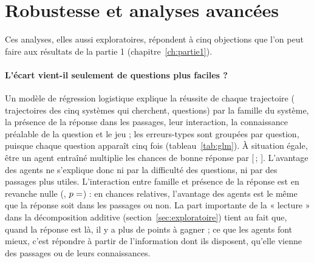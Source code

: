 
\section{Robustesse et analyses avancées}\label{sec:avance}

Ces analyses, elles aussi exploratoires, répondent à cinq objections que l'on peut faire aux résultats de la partie 1 (chapitre~\ref{ch:partie1}).

\paragraph{L'écart vient-il seulement de questions plus faciles ?} Un modèle de régression logistique explique la réussite de chaque trajectoire ( trajectoires des cinq systèmes qui cherchent,  questions) par la famille du système, la présence de la réponse dans les passages, leur interaction, la connaissance préalable de la question et le jeu ; les erreurs-types sont groupées par question, puisque chaque question apparaît cinq fois (tableau~\ref{tab:glm}). À situation égale, être un agent entraîné multiplie les chances de bonne réponse par  [\,; ]. L'avantage des agents ne s'explique donc ni par la difficulté des questions, ni par des passages plus utiles. L'interaction entre famille et présence de la réponse est en revanche nulle (, $p = \valAv{glm-rlxtrouvee-p}$) : en chances relatives, l'avantage des agents est le même que la réponse soit dans les passages ou non. La part importante de la « lecture » dans la décomposition additive (section~\ref{sec:exploratoire}) tient au fait que, quand la réponse est là, il y a plus de points à gagner ; ce que les agents font mieux, c'est répondre à partir de l'information dont ils disposent, qu'elle vienne des passages ou de leurs connaissances.

\begin{table}[ht]
\centering\small

\caption{Régression logistique de la réussite (EM) sur 1\,000 trajectoires (A1 à A5, 200 questions), erreurs-types groupées par question. Un odds ratio supérieur à 1 signifie de meilleures chances de réussite. Référence : harnais, réponse absente des passages, question non connue, jeu NQ.}
\label{tab:glm}
\end{table}

